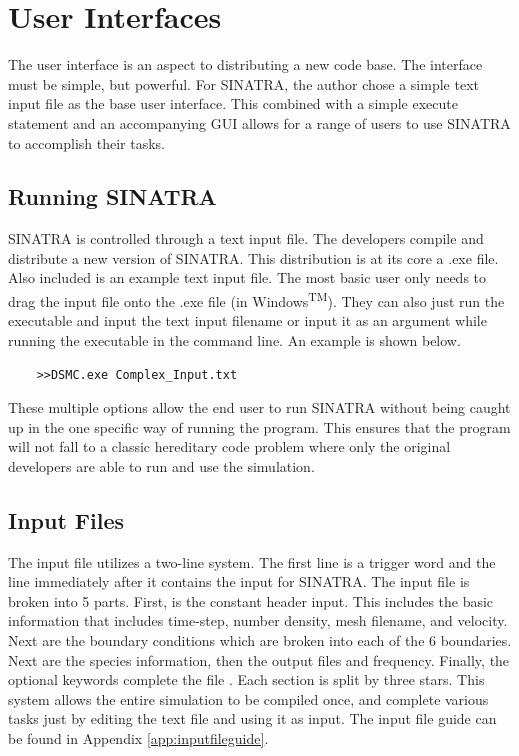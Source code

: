 \section{User Interfaces}
The user interface is an aspect to distributing a new code base. The interface must be simple, but powerful. For SINATRA, the author chose a simple text input file as the base user interface. This combined with a simple execute statement and an accompanying GUI allows for a range of users to use SINATRA to accomplish their tasks.

\subsection{Running SINATRA}
SINATRA is controlled through a text input file. The developers compile and distribute a new version of SINATRA. This distribution is at its core a .exe file. Also included is an example text input file. The most basic user only needs to drag the input file onto the .exe file (in Windows\textsuperscript{TM}). They can also just run the executable and input the text input filename or input it as an argument while running the executable in the command line. An example is shown below. \par

\begin{verbatim}
    >>DSMC.exe Complex_Input.txt
\end{verbatim}

\indent These multiple options allow the end user to run SINATRA without being caught up in the one specific way of running the program. This ensures that the program will not fall to a classic hereditary code problem where only the original developers are able to run and use the simulation.

\subsection{Input Files}
The input file utilizes a two-line system. The first line is a trigger word and the line immediately after it contains the input for SINATRA. The input file is broken into 5 parts. First, is the constant header input. This includes the basic information that includes time-step, number density, mesh filename, and velocity. Next are the boundary conditions which are broken into each of the 6 boundaries. Next are the species information, then the output files and frequency. Finally, the optional keywords  complete the file . Each section is split by three stars. This system allows the entire simulation to be compiled once, and complete various tasks just by editing the text file and using it as input. The input file guide can be found in Appendix \ref{app:inputfileguide}. \par

